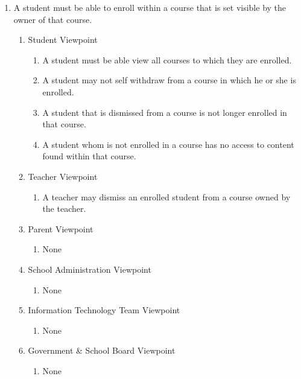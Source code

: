 \documentclass[]{article}
\begin{document}
\begin{enumerate}[{BE}1.]
	\item A student must be able to enroll within a course that is set visible by 
the owner of that course.
	\begin{enumerate}[{VP2}.1]
		\item Student Viewpoint
			\begin{enumerate}
				\item A student must be able view all courses to which they are enrolled.
				\item A student may not self withdraw from a course in which he or she is 
enrolled.
				\item A student that is dismissed from a course is not longer enrolled in 
that course.
				\item A student whom is not enrolled in a course has no access to content 
found within that course.
			\end{enumerate}
		\item Teacher Viewpoint
			\begin{enumerate}
				\item A teacher may dismiss an enrolled student from a course owned by the 
teacher.
			\end{enumerate}
		\item Parent Viewpoint
			\begin{enumerate}
				\item None
			\end{enumerate}
		\item School Administration Viewpoint
			\begin{enumerate}
				\item None
			\end{enumerate}
		\item Information Technology Team Viewpoint
			\begin{enumerate}
				\item None
			\end{enumerate}
		\item Government \& School Board Viewpoint
			\begin{enumerate}
				\item None
			\end{enumerate}
	\end{enumerate}


\end{enumerate}
\end{document}
